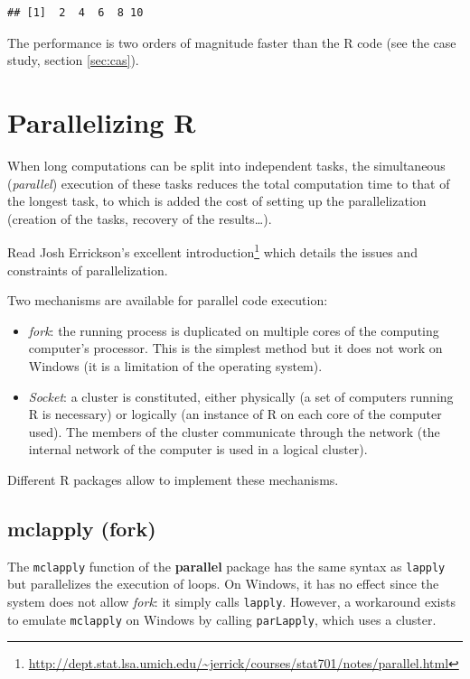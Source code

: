 \documentclass[
  12pt,
  american,
  a4paper,
  extrafontsizes,onecolumn,openright
  ]{memoir}
\providecommand{\tightlist}{%
  \setlength{\itemsep}{0pt}\setlength{\parskip}{0pt}}
\newlength{\rf}
\begin{document}
\begin{verbatim}
## [1]  2  4  6  8 10
\end{verbatim}

\normalsize

The performance is two orders of magnitude faster than the R code (see the case study, section \ref{sec:cas}).

\hypertarget{parallelizing-r}{%
\section{Parallelizing R}\label{parallelizing-r}}

When long computations can be split into independent tasks, the simultaneous (\emph{parallel}) execution of these tasks reduces the total computation time to that of the longest task, to which is added the cost of setting up the parallelization (creation of the tasks, recovery of the results\ldots).

Read Josh Errickson's excellent introduction\footnote{\url{http://dept.stat.lsa.umich.edu/~jerrick/courses/stat701/notes/parallel.html}} which details the issues and constraints of parallelization.

Two mechanisms are available for parallel code execution:

\begin{itemize}
\tightlist
\item
  \emph{fork}: the running process is duplicated on multiple cores of the computing computer's processor.
  This is the simplest method but it does not work on Windows (it is a limitation of the operating system).
\item
  \emph{Socket}: a cluster is constituted, either physically (a set of computers running R is necessary) or logically (an instance of R on each core of the computer used).
  The members of the cluster communicate through the network (the internal network of the computer is used in a logical cluster).
\end{itemize}

Different R packages allow to implement these mechanisms.

\hypertarget{mclapply-fork}{%
\subsection{mclapply (fork)}\label{mclapply-fork}}

The \texttt{mclapply} function of the \textbf{parallel} package has the same syntax as \texttt{lapply} but parallelizes the execution of loops.
On Windows, it has no effect since the system does not allow \emph{fork}: it simply calls \texttt{lapply}.
However, a workaround exists to emulate \texttt{mclapply} on Windows by calling \texttt{parLapply}, which uses a cluster.
\end{document}

